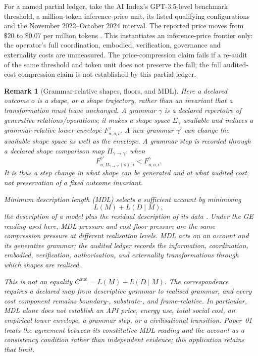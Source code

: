 \documentclass[11pt]{article}
\newtheorem{remark}[definition]{Remark}
\begin{document}
For a named partial ledger, take the AI Index's GPT-3.5-level benchmark
threshold, a million-token inference-price unit, its listed qualifying
configurations and the November 2022--October 2024 interval. The reported
price moves from $\$20$ to $\$0.07$ per million tokens \citep{stanford2025}.
This instantiates an inference-price frontier only: the operator's full
coordination, embodied, verification, governance and externality costs are
unmeasured. The price-compression claim fails if a re-audit of the same
threshold and token unit does not preserve the fall; the full audited-cost
compression claim is not established by this partial ledger.



\begin{remark}[Grammar-relative shapes, floors, and MDL]\label{rem:mdl-cost}
Here a declared outcome $o$ is a shape, or a shape trajectory, rather than an
invariant that a transformation must leave unchanged. A grammar $\gamma$ is a
declared repertoire of generative relations/operations; it makes a shape space
$\Sigma_{\gamma}$ available and induces a grammar-relative lower envelope
$F^{\gamma}_{u,o,i}$. A new grammar $\gamma'$ can change the available shape
space as well as the envelope. A grammar step is recorded through a declared
shape comparison map $\Pi_{\gamma\to\gamma'}$ when
\[
 F^{\gamma'}_{u,\Pi_{\gamma\to\gamma'}(o),i}
 < F^{\gamma}_{u,o,i}.
\]
It is thus a step change in what shape can be generated and at what audited
cost, not preservation of a fixed outcome invariant.

Minimum description length (MDL) selects a sufficient account by minimising
\[
 L(M)+L(D\mid M),
\]
the description of a model plus the residual description of its data
\citep{rissanen1978}. Under the GE reading used here, MDL pressure and
cost-floor pressure are the same compression pressure at different realisation
levels. MDL acts on an account and its generative grammar; the audited ledger
records the information, coordination, embodied, verification, authorisation,
and externality transformations through which shapes are realised.

This is not an equality $C^{\mathrm{aud}}=L(M)+L(D\mid M)$. The correspondence
requires a declared map from descriptive grammar to realised grammar, and every
cost component remains boundary-, substrate-, and frame-relative. In particular,
MDL alone does not establish an API price, energy use, total social cost, an
empirical lower envelope, a grammar step, or a civilisational transition.
Paper~01 treats the agreement between its constitutive MDL reading and the
account as a consistency condition rather than independent evidence; this
application retains that limit.
\end{remark}
\end{document}
